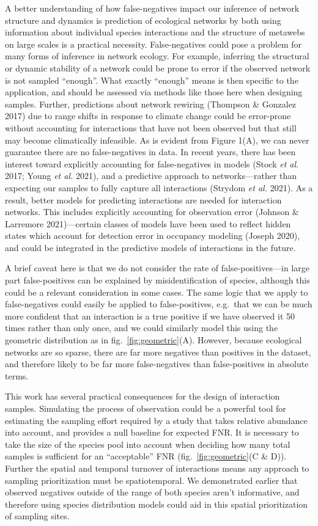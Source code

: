 \documentclass[11pt]{article}
\begin{document}
A better understanding of how false-negatives impact our inference of
network structure and dynamics is prediction of ecological networks by
both using information about individual species interactions and the
structure of metawebs on large scales is a practical necessity.
False-negatives could pose a problem for many forms of inference in
network ecology. For example, inferring the structural or dynamic
stability of a network could be prone to error if the observed network
is not sampled ``enough''. What exactly ``enough'' means is then
specific to the application, and should be assessed via methods like
those here when designing samples. Further, predictions about network
rewiring (Thompson \& Gonzalez 2017) due to range shifts in response to
climate change could be error-prone without accounting for interactions
that have not been observed but that still may become climatically
infeasible. As is evident from Figure 1(A), we can never guarantee there
are no false-negatives in data. In recent years, there has been interest
toward explicitly accounting for false-negatives in models (Stock
\emph{et al.} 2017; Young \emph{et al.} 2021), and a predictive approach
to networks---rather than expecting our samples to fully capture all
interactions (Strydom \emph{et al.} 2021). As a result, better models
for predicting interactions are needed for interaction networks. This
includes explicitly accounting for observation error (Johnson \&
Larremore 2021)---certain classes of models have been used to reflect
hidden states which account for detection error in occupancy modeling
(Joseph 2020), and could be integrated in the predictive models of
interactions in the future.

A brief caveat here is that we do not consider the rate of
false-positives---in large part false-positives can be explained by
misidentification of species, although this could be a relevant
consideration in some cases. The same logic that we apply to
false-negatives could easily be applied to false-positives, e.g.~that we
can be much more confident that an interaction is a true positive if we
have observed it 50 times rather than only once, and we could similarly
model this using the geometric distribution as in
fig.~\ref{fig:geometric}(A). However, because ecological networks are so
sparse, there are far more negatives than positives in the dataset, and
therefore likely to be far more false-negatives than false-positives in
absolute terms.

This work has several practical consequences for the design of
interaction samples. Simulating the process of observation could be a
powerful tool for estimating the sampling effort required by a study
that takes relative abundance into account, and provides a null baseline
for expected FNR. It is necessary to take the size of the species pool
into account when deciding how many total samples is sufficient for an
``acceptable'' FNR (fig.~\ref{fig:geometric}(C \& D)). Further the
spatial and temporal turnover of interactions means any approach to
sampling prioritization must be spatiotemporal. We demonstrated earlier
that observed negatives outside of the range of both species aren't
informative, and therefore using species distribution models could aid
in this spatial prioritization of sampling sites.
\end{document}

